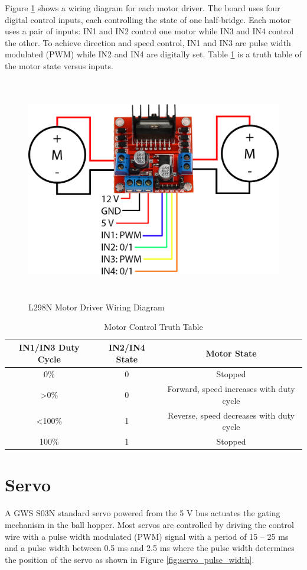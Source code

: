 Figure \ref{fig:l298n} shows a wiring diagram for each motor driver. The board uses four digital control inputs, each controlling the state of one half-bridge. Each motor uses a pair of inputs: IN1 and IN2 control one motor while IN3 and IN4 control the other. To achieve direction and speed control, IN1 and IN3 are pulse width modulated (PWM) while IN2 and IN4 are digitally set. Table \ref{tab:L298N_truth_table} is a truth table of the motor state versus inputs.

\begin{figure}[H]   %
	\centering \includegraphics[width=6in, height=3.85in, keepaspectratio]{figures/l298n.png}
	\caption{L298N Motor Driver Wiring Diagram \cite{l298n}}\label{fig:l298n}
\end{figure}

\begin{table}[h]
	\centering \caption{Motor Control Truth Table}	\label{tab:L298N_truth_table}
	\begin{tabular}{ccc}
		\toprule 
		IN1/IN3 Duty Cycle & IN2/IN4 State & Motor State \\ 
		\midrule 
		0\% & 0 & Stopped \\ 
		\textgreater 0\% & 0 & Forward, speed increases with duty cycle \\ 
		\textless 100\% & 1 & Reverse, speed decreases with duty cycle \\ 
		100\% & 1 & Stopped \\ 
		\bottomrule
	\end{tabular} 
\end{table}

\section{Servo}
A GWS S03N standard servo powered from the 5 V bus actuates the gating mechanism in the ball hopper. Most servos are controlled by driving the control wire with a pulse width modulated (PWM) signal with a period of 15 -- 25 ms and a pulse width between 0.5 ms and 2.5 ms where the pulse width determines the position of the servo as shown in Figure \ref{fig:servo_pulse_width}. 

